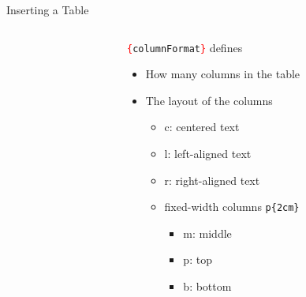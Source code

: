 \begin{frame}[fragile]{Inserting a Table}
\vspace{.5cm}
	\begin{columns}[t]
		\begin{column}{.5\textwidth}
		\end{column}
		\begin{column}{.5\textwidth}
			\texttt{\textcolor{red}{\{}columnFormat\textcolor{red}{\}}} defines
			\begin{itemize}
				\item How many columns in the table
				\item The layout of the columns
				\begin{itemize}
					\item c: centered text
					\item l: left-aligned text
					\item r: right-aligned text
                        \item fixed-width columns \texttt{p\{2cm\}}
                        \begin{itemize}
                            \item m: middle
                            \item p: top
                            \item b: bottom
                        \end{itemize}
				\end{itemize}
			\end{itemize}
		\end{column}
	\end{columns}	
\end{frame}

